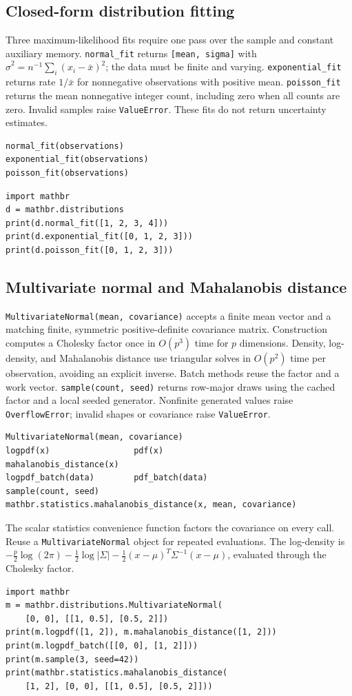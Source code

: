 \documentclass[11pt,a4paper]{article}
\begin{document}
\subsection{Closed-form distribution fitting}
Three maximum-likelihood fits require one pass over the sample and constant auxiliary memory. \verb|normal_fit| returns \verb|[mean, sigma]| with $\hat\sigma^2=n^{-1}\sum_i(x_i-\bar x)^2$; the data must be finite and varying. \verb|exponential_fit| returns rate $1/\bar x$ for nonnegative observations with positive mean. \verb|poisson_fit| returns the mean nonnegative integer count, including zero when all counts are zero. Invalid samples raise \verb|ValueError|. These fits do not return uncertainty estimates.
\begin{verbatim}
normal_fit(observations)
exponential_fit(observations)
poisson_fit(observations)
\end{verbatim}
\begin{verbatim}
import mathbr
d = mathbr.distributions
print(d.normal_fit([1, 2, 3, 4]))
print(d.exponential_fit([0, 1, 2, 3]))
print(d.poisson_fit([0, 1, 2, 3]))
\end{verbatim}

\subsection{Multivariate normal and Mahalanobis distance}
\verb|MultivariateNormal(mean, covariance)| accepts a finite mean vector and a matching finite, symmetric positive-definite covariance matrix. Construction computes a Cholesky factor once in $O(p^3)$ time for $p$ dimensions. Density, log-density, and Mahalanobis distance use triangular solves in $O(p^2)$ time per observation, avoiding an explicit inverse. Batch methods reuse the factor and a work vector. \verb|sample(count, seed)| returns row-major draws using the cached factor and a local seeded generator. Nonfinite generated values raise \verb|OverflowError|; invalid shapes or covariance raise \verb|ValueError|.
\begin{verbatim}
MultivariateNormal(mean, covariance)
logpdf(x)                 pdf(x)
mahalanobis_distance(x)
logpdf_batch(data)        pdf_batch(data)
sample(count, seed)
mathbr.statistics.mahalanobis_distance(x, mean, covariance)
\end{verbatim}
The scalar statistics convenience function factors the covariance on every call. Reuse a \verb|MultivariateNormal| object for repeated evaluations. The log-density is $-\frac{p}{2}\log(2\pi)-\frac12\log|\Sigma|-\frac12(x-\mu)^T\Sigma^{-1}(x-\mu)$, evaluated through the Cholesky factor.
\begin{verbatim}
import mathbr
m = mathbr.distributions.MultivariateNormal(
    [0, 0], [[1, 0.5], [0.5, 2]])
print(m.logpdf([1, 2]), m.mahalanobis_distance([1, 2]))
print(m.logpdf_batch([[0, 0], [1, 2]]))
print(m.sample(3, seed=42))
print(mathbr.statistics.mahalanobis_distance(
    [1, 2], [0, 0], [[1, 0.5], [0.5, 2]]))
\end{verbatim}
\end{document}
